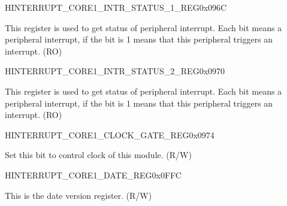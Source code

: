 \begin{register}{H}{INTERRUPT\_CORE1\_INTR\_STATUS\_1\_REG}{0x096C}\label{regdesc:INTERRUPTCORE1INTRSTATUS1REG}
%
\regnewline%
\begin{regdesc}\begin{reglist}
\label{fielddesc:INTERRUPTCORE1INTRSTATUS1}\item [INTERRUPT\_CORE1\_INTR\_STATUS\_1] This register is used to get status of peripheral interrupt. Each bit means a peripheral interrupt, if the bit is 1 means that this peripheral triggers an interrupt. (RO)
\end{reglist}\end{regdesc}
\end{register}


\begin{register}{H}{INTERRUPT\_CORE1\_INTR\_STATUS\_2\_REG}{0x0970}\label{regdesc:INTERRUPTCORE1INTRSTATUS2REG}
%
\regnewline%
\begin{regdesc}\begin{reglist}
\label{fielddesc:INTERRUPTCORE1INTRSTATUS2}\item [INTERRUPT\_CORE1\_INTR\_STATUS\_2] This register is used to get status of peripheral interrupt. Each bit means a peripheral interrupt, if the bit is 1 means that this peripheral triggers an interrupt. (RO)
\end{reglist}\end{regdesc}
\end{register}


\begin{register}{H}{INTERRUPT\_CORE1\_CLOCK\_GATE\_REG}{0x0974}\label{regdesc:INTERRUPTCORE1CLOCKGATEREG}
%
%
\regnewline%
\begin{regdesc}\begin{reglist}
\label{fielddesc:INTERRUPTCORE1REGCLKEN}\item [INTERRUPT\_CORE1\_CLK\_EN] Set this bit to control clock of this module. (R/W)
\end{reglist}\end{regdesc}
\end{register}


\begin{register}{H}{INTERRUPT\_CORE1\_DATE\_REG}{0x0FFC}\label{regdesc:INTERRUPTCORE1DATEREG}
%
%
\regnewline%
\begin{regdesc}\begin{reglist}
\label{fielddesc:INTERRUPTCORE1INTERRUPTREGDATE}\item [INTERRUPT\_CORE1\_INTERRUPT\_DATE] This is the date version register. (R/W)
\end{reglist}\end{regdesc}
\end{register}
